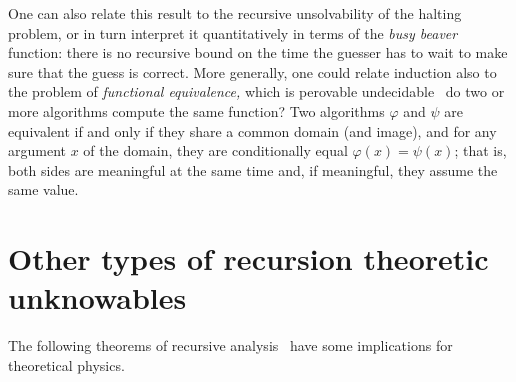One can also relate this result to the recursive
unsolvability of the halting problem, or in turn interpret it quantitatively in terms of  the {\em busy beaver} function:
there is no recursive bound on the
time the guesser has to wait  to make sure that the guess is
correct.
More generally, one could relate induction also to
the problem of {\em functional equivalence,}
which is perovable undecidable~\cite[\S~2.1, pp.~33,34]{rogers1}
do two or more algorithms compute the same function?
Two algorithms $\varphi$ and $\psi$ are equivalent if  and only if
they share a common domain (and image), and  for any argument $x$ of the domain,
they are  conditionally equal  $\varphi (x) = \psi (x)$;
that is, both sides are meaningful at the same time and, if meaningful, they assume the same value.



\chapter{Other types of recursion theoretic unknowables}
\label{2016-pu-book-chapter-otrtu}


The following theorems of recursive  analysis~\cite{aberth-80,Weihrauch} have some
implications for theoretical physics.

